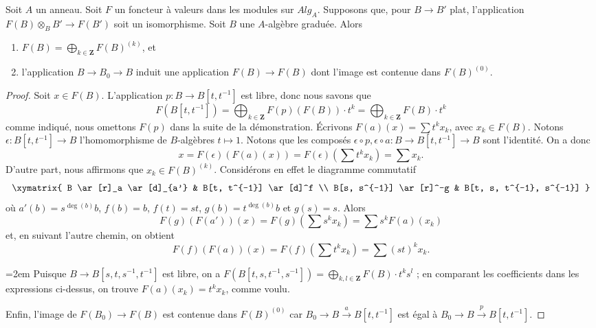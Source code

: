 \begin{lemma}
\label{lemma-flat-functor-split}
Soit $A$ un anneau.
Soit $F$ un foncteur à valeurs dans les modules sur $\textit{Alg}_A$.
Supposons que, pour $B \to B'$ plat, l'application
$F(B) \otimes_B B' \to F(B')$ soit un isomorphisme.
Soit $B$ une $A$-algèbre graduée. Alors
\begin{enumerate}
\item $F(B) = \bigoplus_{k \in \mathbf{Z}} F(B)^{(k)}$, et
\item l'application $B \to B_0 \to B$ induit une application $F(B) \to F(B)$
dont l'image est contenue dans $F(B)^{(0)}$.
\end{enumerate}
\end{lemma}

\begin{proof}
Soit $x \in F(B)$. L'application $p : B \to B[t, t^{-1}]$ est libre,
donc nous savons que
$$
F(B[t, t^{-1}]) =
\bigoplus\nolimits_{k \in \mathbf{Z}} F(p)(F(B)) \cdot t^k =
\bigoplus\nolimits_{k \in \mathbf{Z}} F(B) \cdot t^k
$$
comme indiqué, nous omettons $F(p)$ dans la suite de la démonstration.
Écrivons $F(a)(x) = \sum t^k x_k$, avec $x_k \in F(B)$.
Notons $\epsilon : B[t, t^{-1}] \to B$
l'homomorphisme de $B$-algèbres $t \mapsto 1$. Notons que les composés
$\epsilon \circ p, \epsilon \circ a : B \to B[t, t^{-1}] \to B$ sont
l'identité. On a donc
$$
x = F(\epsilon)(F(a)(x)) = F(\epsilon)(\sum t^k x_k) = \sum x_k.
$$
D'autre part, nous affirmons que $x_k \in F(B)^{(k)}$. Considérons en effet
le diagramme commutatif
$$
\xymatrix{
B \ar[r]_a \ar[d]_{a'} &
B[t, t^{-1}] \ar[d]^f \\
B[s, s^{-1}] \ar[r]^-g &
B[t, s, t^{-1}, s^{-1}]
}
$$
où $a'(b) = s^{\deg(b)}b$, $f(b) = b$, $f(t) = st$,
$g(b) = t^{\deg(b)}b$ et $g(s) = s$. Alors
$$
F(g)(F(a'))(x) = F(g)(\sum s^k x_k) =
\sum s^k F(a)(x_k)
$$
et, en suivant l'autre chemin, on obtient
$$
F(f)(F(a))(x) = F(f)(\sum t^k x_k) = \sum (st)^k x_k.
$$
{\emergencystretch=2em
Puisque $B \to B[s, t, s^{-1}, t^{-1}]$ est libre, on a
$F(B[t, s, t^{-1}, s^{-1}]) =
\bigoplus_{k, l \in \mathbf{Z}} F(B) \cdot t^ks^l$ ;
en comparant les coefficients dans les expressions ci-dessus, on trouve
$F(a)(x_k) = t^k x_k$, comme voulu.\par}

\medskip\noindent
Enfin, l'image de $F(B_0) \to F(B)$ est contenue dans $F(B)^{(0)}$
car $B_0 \to B \xrightarrow{a} B[t, t^{-1}]$ est égal à
$B_0 \to B \xrightarrow{p} B[t, t^{-1}]$.
\end{proof}

